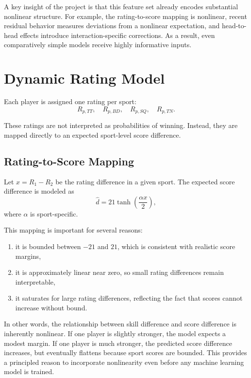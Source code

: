 \documentclass[10pt,twocolumn]{article}
\begin{document}
A key insight of the project is that this feature set already encodes substantial nonlinear structure. For example, the rating-to-score mapping is nonlinear, recent residual behavior measures deviations from a nonlinear expectation, and head-to-head effects introduce interaction-specific corrections. As a result, even comparatively simple models receive highly informative inputs.

\section{Dynamic Rating Model}

Each player is assigned one rating per sport:
\[
    R_{p,TT}, \quad R_{p,BD}, \quad R_{p,SQ}, \quad R_{p,TN}.
\]

These ratings are not interpreted as probabilities of winning. Instead, they are mapped directly to an expected sport-level score difference.

\subsection{Rating-to-Score Mapping}

Let $x = R_1 - R_2$ be the rating difference in a given sport. The expected score difference is modeled as
\[
    \hat{d} = 21 \tanh\left(\frac{\alpha x}{2}\right),
\]
where $\alpha$ is sport-specific.

This mapping is important for several reasons:
\begin{enumerate}[leftmargin=1.2em,itemsep=0.25em]
    \item it is bounded between $-21$ and $21$, which is consistent with realistic score margins,
    \item it is approximately linear near zero, so small rating differences remain interpretable,
    \item it saturates for large rating differences, reflecting the fact that scores cannot increase without bound.
\end{enumerate}

In other words, the relationship between skill difference and score difference is inherently nonlinear. If one player is slightly stronger, the model expects a modest margin. If one player is much stronger, the predicted score difference increases, but eventually flattens because sport scores are bounded. This provides a principled reason to incorporate nonlinearity even before any machine learning model is trained.
\end{document}
